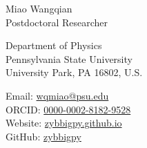 \documentclass[11pt,a4paper]{article}
\makeatletter
\newcommand{\Name}{Miao Wangqian}
\newcommand{\Role}{Postdoctoral Researcher}
\newcommand{\Email}{wqmiao@psu.edu}
\newcommand{\Website}{zybbigpy.github.io}
\newcommand{\Github}{zybbigpy}
\newcommand{\Orcid}{0000-0002-8182-9528}
\newcommand{\Affiliation}{Department of Physics \\ Pennsylvania State University}
\newcommand{\Address}{University Park, PA 16802, U.S.}
\makeatother
\begin{document}
\thispagestyle{empty} %
{
\begin{center}
{\fontsize{24pt}{0}\selectfont \Name \hspace{1ex}} \\[0.4cm]
{\fontsize{16pt}{0}\selectfont \Role} \\[0.2cm]
\end{center}
\begin{minipage}[t]{0.7\textwidth}
  \fontsize{12pt}{15pt}\selectfont
  \Affiliation
  \\
  \Address
\end{minipage}
\begin{minipage}[t]{0.3\textwidth}
  \fontsize{12pt}{15pt}\selectfont
  \begin{flushleft}
    Email: \href{mailto:\Email}{\Email}
    \\
    ORCID: \href{https://orcid.org/\Orcid}{\Orcid}
    \\
    Website: \href{https://\Website}{\Website}
    \\
    GitHub: \href{https://github.com/\Github}{\Github}
  \end{flushleft}
\end{minipage}
}
\vspace{0.2cm}








\end{document}
